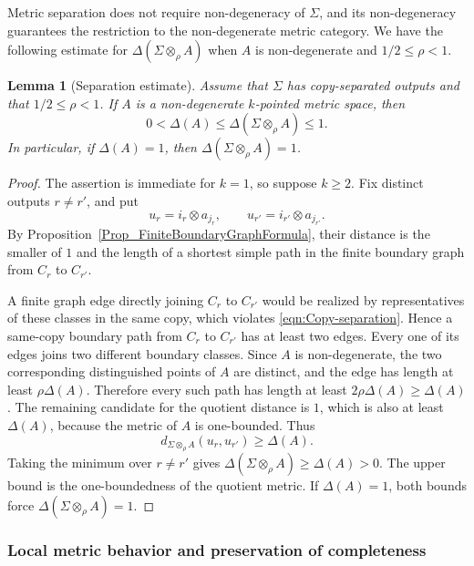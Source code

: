 \documentclass{sn-jnl}%
\theoremstyle{thmstyleone}%
\newtheorem{lemma}[theorem]{Lemma}%
\theoremstyle{thmstyletwo}%
\theoremstyle{thmstylethree}%
\newcommand{\M}{\Sigma}
\newcommand{\Fw}{\M\otimes_{\w}}
\newcommand{\w}{\rho}
\begin{document}
Metric separation does not require non-degeneracy of $\Sigma$, and its non-degeneracy guarantees the restriction to the non-degenerate metric category. We have the following estimate for $\Delta(\Fw A)$ when $A$ is non-degenerate and $1/2 \leq \w < 1$. 

\begin{lemma}[Separation estimate]
\label{Lem_DeltaOFMA}
    Assume that $\Sigma$ has copy-separated outputs and that $1/2\leq\w<1$. If $A$ is a non-degenerate $k$-pointed metric space, then
    \begin{equation} 
    \nonumber
       0<\Delta(A)\leq\Delta(\Fw A)\leq1.
    \end{equation}
    In particular, if $\Delta(A)=1$, then $\Delta(\Fw A)=1$.
\end{lemma}

\begin{proof}
The assertion is immediate for $k=1$, so suppose $k\geq2$.  Fix distinct outputs $r\neq r'$, and put
\begin{equation} 
\nonumber
   u_r=i_r\otimes a_{j_r}, \qquad u_{r'}=i_{r'}\otimes a_{j_{r'}}.
\end{equation}
By Proposition~\ref{Prop_FiniteBoundaryGraphFormula}, their distance is the smaller of $1$ and the length of a shortest simple path in the finite boundary graph from $C_r$ to $C_{r'}$.

A finite graph edge directly joining $C_r$ to $C_{r'}$ would be realized by representatives of these classes in the same copy, which violates \eqref{eqn:Copy-separation}.  Hence a same-copy boundary path from $C_r$ to $C_{r'}$ has at least two edges.  Every one of its edges joins two different boundary classes. Since $A$ is non-degenerate, the two corresponding distinguished points of $A$ are distinct, and the edge has length at least $\w\Delta(A)$.  Therefore every such path has length at least $2\w\Delta(A)\geq\Delta(A)$. The remaining candidate for the quotient distance is $1$, which is also at least $\Delta(A)$, because the metric of $A$ is one-bounded. Thus
\begin{equation} \nonumber
   d_{\Fw A}(u_r,u_{r'})\geq\Delta(A).
\end{equation}
Taking the minimum over $r\neq r'$ gives $\Delta(\Fw A)\geq\Delta(A)>0$.  The upper bound is the one-boundedness of the quotient metric.  If $\Delta(A)=1$, both bounds force $\Delta(\Fw A)=1$.
\end{proof}

\subsubsection{Local metric behavior and preservation of completeness}
\end{document}

